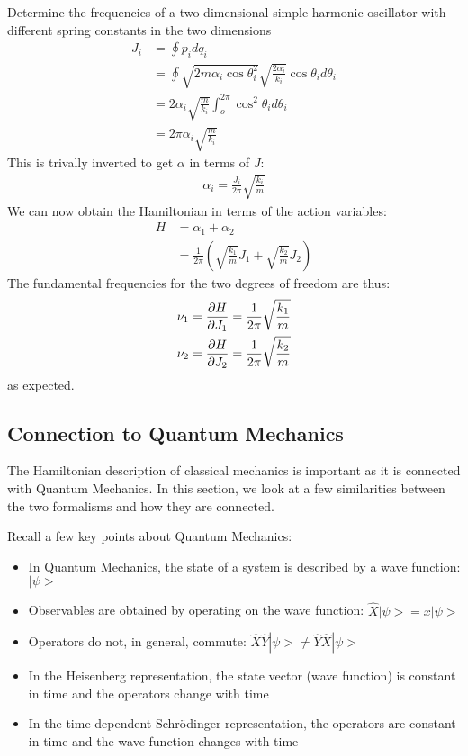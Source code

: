 \begin{example}{0pt}{Determine the frequencies of a two-dimensional simple harmonic oscillator with different spring constants in the two dimensions}{}
\begin{align*}
J_i&=\oint p_i dq_i\\
&=\oint \sqrt{2m\alpha_i\cos\theta_i^2} \sqrt{\frac{2\alpha_i}{k_i}}\cos\theta_id\theta_i\\
&=2\alpha_i\sqrt{\frac{m}{k_i}}\int_o^{2\pi} \cos^2\theta_i d\theta_i\\
&=2\pi\alpha_i\sqrt{\frac{m}{k_i}}
\end{align*}
This is trivally inverted to get $\alpha$ in terms of $J$:
\begin{align*}
\alpha_i=\frac{J_i}{2\pi}\sqrt{\frac{k_i}{m}}
\end{align*}
We can now obtain the Hamiltonian in terms of the action variables:
\begin{align*}
H&=\alpha_1+\alpha_2\\
&=\frac{1}{2\pi}\left(\sqrt{\frac{k_1}{m}}J_1+\sqrt{\frac{k_2}{m}}J_2\right)
\end{align*}
The fundamental frequencies for the two degrees of freedom are thus:
\begin{align*}
\nu_1&=\frac{\partial H}{\partial J_1}=\frac{1}{2\pi}\sqrt{\frac{k_1}{m}}\\
\nu_2&=\frac{\partial H}{\partial J_2}=\frac{1}{2\pi}\sqrt{\frac{k_2}{m}}
\end{align*}
as expected.
\label{ex:AASHO}
\end{example}

\subsection{Connection to Quantum Mechanics}
The Hamiltonian description of classical mechanics is important as it is connected with Quantum Mechanics. In this section, we look at a few similarities between the two formalisms and how they are connected.

Recall a few key points about Quantum Mechanics:
\begin{itemize}
\item In Quantum Mechanics, the state of a system is described by a wave function: $|\psi>$
\item Observables are obtained by operating on the wave function: $\hat X|\psi>=x|\psi>$
\item Operators do not, in general, commute: $\hat X\hat Y|\psi>\neq\hat Y \hat X|\psi>$
\item In the Heisenberg representation, the state vector (wave function) is constant in time and the operators change with time
\item In the time dependent Schr\"odinger representation, the operators are constant in time and the wave-function changes with time
\end{itemize}

